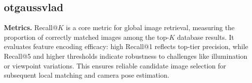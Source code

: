 \documentclass[journal]{IEEEtran}
\begin{document}



\subsection{otgaussvlad}
\textbf{Metrics.} Recall@$K$ is a core metric for global image retrieval, measuring the proportion of correctly matched images among the top-$K$ database results. It evaluates feature encoding efficacy: high Recall@1 reflects top-tier precision, while Recall@5 and higher thresholds indicate robustness to challenges like illumination or viewpoint variations. This ensures reliable candidate image selection for subsequent local matching and camera pose estimation.
\end{document}
